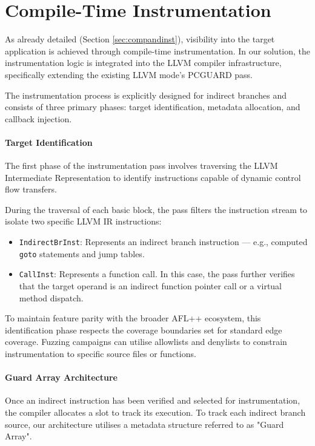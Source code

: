 \section{Compile-Time Instrumentation}

As already detailed (Section \ref{sec:compandinst}), visibility into the target application is achieved through compile-time instrumentation. In our solution, the instrumentation logic is integrated into the LLVM compiler infrastructure, specifically extending the existing LLVM mode's PCGUARD pass. 

The instrumentation process is explicitly designed for indirect branches and consists of three primary phases: target identification, metadata allocation, and callback injection.

\paragraph{Target Identification} The first phase of the instrumentation pass involves traversing the LLVM Intermediate Representation to identify instructions capable of dynamic control flow transfers. 

During the traversal of each basic block, the pass filters the instruction stream to isolate two specific LLVM IR instructions: 
\begin{itemize}
    \item \texttt{IndirectBrInst}: Represents an indirect branch instruction --- e.g., computed \texttt{goto} statements and jump tables.

    \item \texttt{CallInst}: Represents a function call. In this case, the pass further verifies that the target operand is an indirect function pointer call or a virtual method dispatch.
\end{itemize}

To maintain feature parity with the broader AFL++ ecosystem, this identification phase respects the coverage boundaries set for standard edge coverage. Fuzzing campaigns can utilise allowlists and denylists to constrain instrumentation to specific source files or functions.

\paragraph{Guard Array Architecture} Once an indirect instruction has been verified and selected for instrumentation, the compiler allocates a slot to track its execution. To track each indirect branch source, our architecture utilises a metadata structure referred to as "Guard Array".

